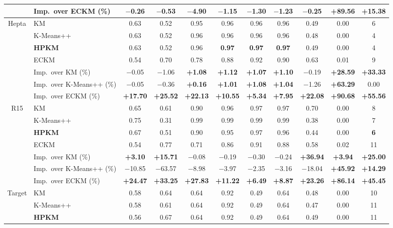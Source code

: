 \begin{table}[p]
\begin{adjustbox}{max width=\textwidth, max totalheight=0.86\textheight}
\begin{tabular}{|c|l|ccccccccc|}
& Imp.\ over ECKM (\%) & $-$0.26 & $-$0.53 & $-$4.90 & $-$1.15 & $-$1.30 & $-$1.23 & $-$0.25 & \textbf{+89.56} & \textbf{+15.38} \\
\hline
Hepta & KM & 0.63 & 0.52 & 0.95 & 0.96 & 0.96 & 0.96 & 0.49 & 0.00 & 6 \\
 & K-Means++ & 0.63 & 0.52 & 0.96 & 0.96 & 0.96 & 0.96 & 0.48 & 0.00 & 4 \\
 & \textbf{HPKM} & 0.63 & 0.52 & 0.96 & \textbf{0.97} & \textbf{0.97} & \textbf{0.97} & 0.49 & 0.00 & 4 \\
 & ECKM & 0.54 & 0.70 & 0.78 & 0.88 & 0.92 & 0.90 & 0.63 & 0.01 & 9 \\
& Imp.\ over KM (\%) & $-$0.05 & $-$1.06 & \textbf{+1.08} & \textbf{+1.12} & \textbf{+1.07} & \textbf{+1.10} & $-$0.19 & \textbf{+28.59} & \textbf{+33.33} \\
& Imp.\ over K-Means++ (\%) & $-$0.05 & $-$0.36 & \textbf{+0.16} & \textbf{+1.01} & \textbf{+1.08} & \textbf{+1.04} & $-$1.26 & \textbf{+63.29} & 0.00 \\
& Imp.\ over ECKM (\%) & \textbf{+17.70} & \textbf{+25.52} & \textbf{+22.13} & \textbf{+10.55} & \textbf{+5.34} & \textbf{+7.95} & \textbf{+22.08} & \textbf{+90.68} & \textbf{+55.56} \\
\hline
R15 & KM & 0.65 & 0.61 & 0.90 & 0.96 & 0.97 & 0.97 & 0.70 & 0.00 & 8 \\
 & K-Means++ & 0.75 & 0.31 & 0.99 & 0.99 & 0.99 & 0.99 & 0.38 & 0.00 & 7 \\
 & \textbf{HPKM} & 0.67 & 0.51 & 0.90 & 0.95 & 0.97 & 0.96 & 0.44 & 0.00 & \textbf{6} \\
 & ECKM & 0.54 & 0.77 & 0.71 & 0.86 & 0.91 & 0.88 & 0.58 & 0.02 & 11 \\
& Imp.\ over KM (\%) & \textbf{+3.10} & \textbf{+15.71} & $-$0.08 & $-$0.19 & $-$0.30 & $-$0.24 & \textbf{+36.94} & \textbf{+3.94} & \textbf{+25.00} \\
& Imp.\ over K-Means++ (\%) & $-$10.85 & $-$63.57 & $-$8.98 & $-$3.97 & $-$2.35 & $-$3.16 & $-$18.04 & \textbf{+45.92} & \textbf{+14.29} \\
& Imp.\ over ECKM (\%) & \textbf{+24.47} & \textbf{+33.25} & \textbf{+27.83} & \textbf{+11.22} & \textbf{+6.49} & \textbf{+8.87} & \textbf{+23.26} & \textbf{+86.14} & \textbf{+45.45} \\
\hline
Target & KM & 0.58 & 0.64 & 0.64 & 0.92 & 0.49 & 0.64 & 0.48 & 0.00 & 10 \\
 & K-Means++ & 0.58 & 0.61 & 0.64 & 0.92 & 0.49 & 0.64 & 0.47 & 0.00 & 11 \\
 & \textbf{HPKM} & 0.56 & 0.67 & 0.64 & 0.92 & 0.49 & 0.64 & 0.49 & 0.00 & 11 \\

\end{tabular}
\end{adjustbox}
\end{table}
